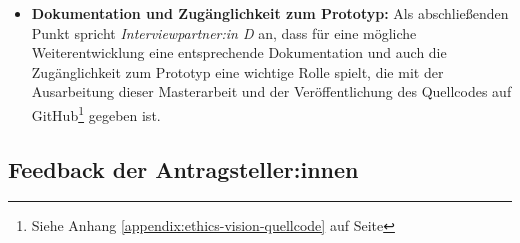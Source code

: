 \documentclass[a4paper,12pt,twoside,numbers=noendperiod]{scrreprt}
\begin{document}
\begin{itemize}
    \item \textbf{Dokumentation und Zugänglichkeit zum Prototyp:} Als abschließenden Punkt spricht \textit{Interviewpartner:in D} an, dass für eine mögliche Weiterentwicklung eine entsprechende Dokumentation und auch die Zugänglichkeit zum Prototyp eine wichtige Rolle spielt, die mit der Ausarbeitung dieser Masterarbeit und der Veröffentlichung des Quellcodes auf GitHub\footnote{Siehe Anhang \ref{appendix:ethics-vision-quellcode} auf Seite \pageref{appendix:ethics-vision-quellcode}} gegeben ist.
\end{itemize}

\subsection{Feedback der Antragsteller:innen}
\label{sub-sec:feedback-antragsteller}
\end{document}
